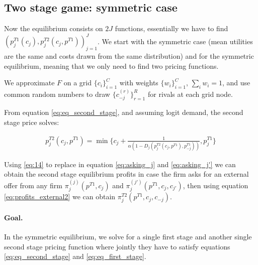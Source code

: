 \documentclass[12pt]{article}
\begin{document}
\subsection{Two stage game: symmetric case}

Now the equilibrium consists on $2J$ functions, essentially we have to find $(p_j^{T1}(c_j), p_j^{T2}(c_j, p^{T1}))_{j=1}^J$. We start with the symmetric case (mean utilities are the same and costs drawn from the same distribution) and for the symmetric equilibrium, meaning that we only need to find two pricing functions.


We approximate $F$ on a grid $\{c_i\}_{i=1}^C$ with weights $\{w_i\}_{i=1}^C$, $\sum_i w_i=1$, and use common random numbers to draw $\{c_{-j}^{(r)}\}_{r=1}^R$ for rivals at each grid node.

From equation \ref{eq:eq_second_stage}, and assuming logit demand, the second stage price solves: 

\begin{align}\label{eq:14} %
    p_j^{T2}(c_j, p^{T1}) = \min \{c_j+\frac{1}{\alpha   (1 -D_j(p_j^{T2}(c_j, p^{T1}), p_{-j}^{T1}))}, p_j^{T1}  \}
\end{align}

Using \ref{eq:14} to replace in equation \ref{eq:asking_j} and \ref{eq:asking_j'} we can obtain the second stage equilibrium profits in case the firm asks for an external offer from any firm $\pi_j^{(j)}(p^{T1}, c_j)$ and $\pi_j^{(j')}(p^{T1}, c_j, c_{j'})$, then using equation \ref{eq:profits_external2} we can obtain $\pi_j^{T2}(p^{T1}, c_j, c_{-j})$. 

\paragraph{Goal.} In the symmetric equilibrium, we solve for a single first stage and another single second stage pricing function where jointly they have to satisfy equations \ref{eq:eq_second_stage} and \ref{eq:eq_first_stage}. 
\end{document}
